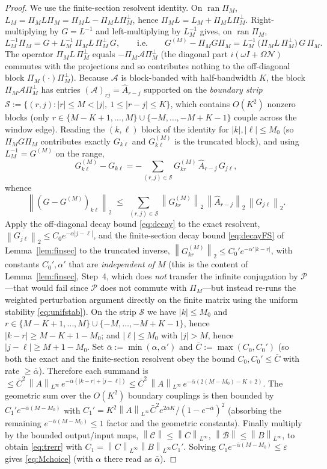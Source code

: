 \documentclass{amsart}
\theoremstyle{definition}
\newcommand{\norm}[1]{\left\lVert#1\right\rVert}
\newcommand{\Acal}{\mathcal{A}}
\newcommand{\Bcal}{\mathcal{B}}
\newcommand{\Ccal}{\mathcal{C}}
\newcommand{\Ncal}{\mathcal{N}}
\begin{document}
\begin{proof}
We use the finite-section resolvent identity. On $\operatorname{ran}\Pi_M$,
$L_M = \Pi_M L \Pi_M = \Pi_M L - \Pi_M L \Pi_M^\perp$, hence
$\Pi_M L = L_M + \Pi_M L \Pi_M^\perp$. Right-multiplying by $G=L^{-1}$ and
left-multiplying by $L_M^{-1}$ gives, on $\operatorname{ran}\Pi_M$,
\[
L_M^{-1}\Pi_M = G + L_M^{-1}\,\Pi_M L\,\Pi_M^\perp\,G ,
\qquad\text{i.e.}\qquad
G^{(M)}-\Pi_M G\Pi_M
= L_M^{-1}\,\big(\Pi_M L\,\Pi_M^\perp\big)\,G\,\Pi_M .
\]
The operator $\Pi_M L\,\Pi_M^\perp$ equals $-\Pi_M\Acal\Pi_M^\perp$ (the
diagonal part $i(\omega I+\Omega\Ncal)$ commutes with the projections and so
contributes nothing to the off-diagonal block $\Pi_M(\cdot)\Pi_M^\perp$).
Because $\Acal$ is block-banded with half-bandwidth $K$, the block
$\Pi_M\Acal\Pi_M^\perp$ has entries $(\Acal)_{rj}=\hat A_{r-j}$ supported on the
\emph{boundary strip}
$\mathcal S:=\{(r,j): |r|\le M<|j|,\ 1\le |r-j|\le K\}$, which contains $O(K^2)$
nonzero blocks (only $r\in\{M-K+1,\dots,M\}\cup\{-M,\dots,-M+K-1\}$ couple
across the window edge). Reading the $(k,\ell)$ block of the identity for
$|k|,|\ell|\le M_0$ (so $\Pi_M G\Pi_M$ contributes exactly $G_{k\ell}$ and
$G^{(M)}_{k\ell}$ is the truncated block), and using
$L_M^{-1}=G^{(M)}$ on the range,
\[
G^{(M)}_{k\ell}-G_{k\ell}
= -\sum_{(r,j)\in\mathcal S} G^{(M)}_{kr}\,\hat A_{r-j}\,G_{j\ell},
\]
whence
\[
\norm{(G-G^{(M)})_{k\ell}}_2
\;\le\; \sum_{(r,j)\in\mathcal S}
\norm{G^{(M)}_{kr}}_2\,\norm{\hat A_{r-j}}_2\,\norm{G_{j\ell}}_2 .
\]
Apply the off-diagonal decay bound \eqref{eq:decay} to the exact resolvent,
$\norm{G_{j\ell}}_2\le C_0 e^{-\alpha|j-\ell|}$, and the finite-section decay bound \eqref{eq:decayFS} of
Lemma~\ref{lem:finsec} to the truncated inverse,
$\norm{G^{(M)}_{kr}}_2\le C_0'e^{-\alpha'|k-r|}$, with constants $C_0',\alpha'$
that are \emph{independent of $M$} (this is the content of
Lemma~\ref{lem:finsec}, Step~4, which does \emph{not} transfer the infinite
conjugation by $\mathcal P$---that would fail since $\mathcal P$ does not commute
with $\Pi_M$---but instead re-runs the weighted perturbation argument directly on
the finite matrix using the uniform stability \eqref{eq:unifstab}). On the strip $\mathcal S$ we have
$|k|\le M_0$ and $r\in\{M-K+1,\dots,M\}\cup\{-M,\dots,-M+K-1\}$, hence
$|k-r|\ge M-K+1-M_0$; and $|\ell|\le M_0$ with $|j|>M$, hence
$|j-\ell|\ge M+1-M_0$. Set $\bar\alpha:=\min(\alpha,\alpha')$ and
$\bar C:=\max(C_0,C_0')$ (so both the exact and the finite-section resolvent obey
the bound $C_0,C_0'\le\bar C$ with rate $\ge\bar\alpha$). Therefore each summand is
$\le \bar C^2\,\norm{A}_{L^\infty}\,e^{-\bar\alpha(|k-r|+|j-\ell|)}
\le \bar C^2\,\norm{A}_{L^\infty}\,e^{-\bar\alpha(2(M-M_0)-K+2)}$. The
geometric sum over the $O(K^2)$ boundary couplings is then bounded by
$C_1' e^{-\bar\alpha(M-M_0)}$ with
$C_1'=K^2\norm{A}_{L^\infty}\bar C^2 e^{2\bar\alpha K}/(1-e^{-\bar\alpha})^2$
(absorbing the remaining $e^{-\bar\alpha(M-M_0)}\le 1$ factor and the geometric
constants). Finally
multiply by the bounded output/input maps,
$\norm{\Ccal}\le\norm{C}_{L^\infty}$, $\norm{\Bcal}\le\norm{B}_{L^\infty}$,
to obtain \eqref{eq:trerr} with
$C_1=\norm{C}_{L^\infty}\norm{B}_{L^\infty}C_1'$. Solving
$C_1 e^{-\bar\alpha(M-M_0)}\le\varepsilon$ gives \eqref{eq:Mchoice} (with $\alpha$ there read as $\bar\alpha$).
\end{proof}
\end{document}
